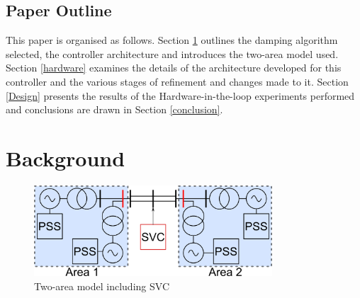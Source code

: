 \documentclass[conference]{IEEEtran}
\begin{document}




\subsection{Paper Outline}
This paper is organised as follows. Section \ref{background} outlines the damping algorithm selected, the controller architecture and introduces the two-area model used. Section \ref{hardware} examines the details of the architecture developed for this controller and the various stages of refinement and changes made to it. Section \ref{Design} presents the results of the Hardware-in-the-loop experiments performed and conclusions are drawn in Section \ref{conclusion}.

\section{Background}\label{background}

\begin{figure}[!h]
\centering
\includegraphics[width=3.5in]{TwoArea.png} 
\caption{Two-area model including SVC}
\label{TwoArea}
\end{figure}
\end{document}
